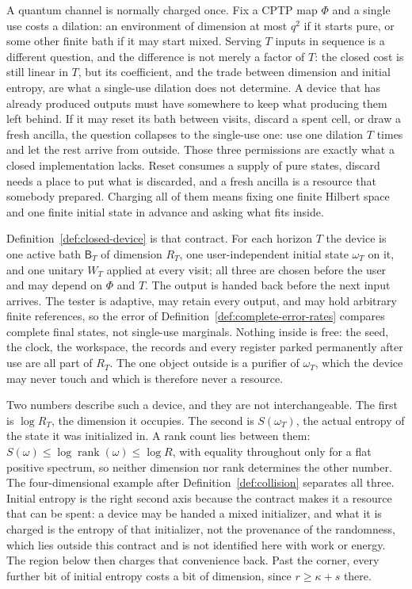 \documentclass[11pt,a4paper]{article}
\numberwithin{equation}{section}
\theoremstyle{plain}
\theoremstyle{definition}
\DeclareMathOperator{\rank}{rank}
\newcommand{\rg}[1]{\mathsf{#1}}
\begin{document}
A quantum channel is normally charged once. Fix a CPTP map $\Phi$ and a single
use costs a dilation: an environment of dimension at most $q^2$ if it starts
pure, or some other finite bath if it may start mixed. Serving $T$ inputs in
sequence is a different question, and the difference is not merely a factor
of $T$: the closed cost is still linear in $T$, but its coefficient, and the
trade between dimension and initial entropy, are what a single-use dilation
does not determine. A
device that has already produced outputs must have somewhere to keep what
producing them left behind. If it may reset its bath between visits, discard a
spent cell, or draw a fresh ancilla, the question collapses to the single-use
one: use one dilation $T$ times and let the rest arrive from outside. Those
three permissions are exactly what a closed implementation lacks. Reset
consumes a supply of pure states, discard needs a place to put what is
discarded, and a fresh ancilla is a resource that somebody prepared. Charging
all of them means fixing one finite Hilbert space and one finite initial state
in advance and asking what fits inside.

Definition~\ref{def:closed-device} is that contract. For each horizon $T$ the
device is one active bath $\rg{B}_T$ of dimension $R_T$, one user-independent
initial state $\omega_T$ on it, and one unitary $W_T$ applied at every visit;
all three are chosen before the user and may depend on $\Phi$ and $T$. The
output is handed back before the next input arrives. The tester is adaptive,
may retain every output, and may hold arbitrary finite references, so the
error of Definition~\ref{def:complete-error-rates} compares complete final
states, not single-use marginals. Nothing inside is free: the seed, the clock,
the workspace, the records and every register parked permanently after use are
all part of $R_T$. The one object outside is a purifier of $\omega_T$, which
the device may never touch and which is therefore never a resource.

Two numbers describe such a device, and they are not interchangeable. The
first is $\log R_T$, the dimension it occupies. The second is $S(\omega_T)$,
the actual entropy of the state it was initialized in. A rank count lies
between them: $S(\omega)\le\log\rank(\omega)\le\log R$, with equality
throughout only for a flat positive spectrum, so neither dimension nor rank
determines the other number. The four-dimensional example after
Definition~\ref{def:collision} separates all three. Initial entropy is the
right second axis because the contract makes it a resource that can be spent:
a device may be handed a mixed initializer, and what it is charged is the
entropy of that initializer, not the provenance of the randomness, which lies
outside this contract and is not identified here with work or energy. The
region below then charges that convenience back. Past the corner, every
further bit of initial entropy costs a bit of dimension, since $r\ge\kappa+s$
there.
\end{document}
